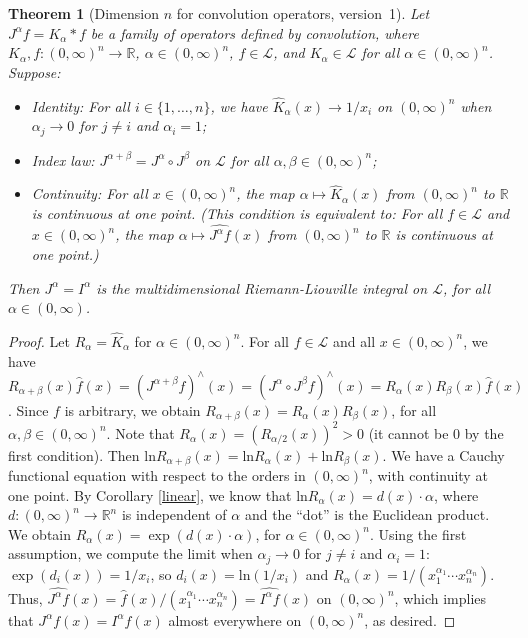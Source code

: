 \documentclass[12pt,reqno]{amsart}
\theoremstyle{plain}
\newtheorem{theorem}{Theorem}[section] %
\numberwithin{equation}{section} %
\begin{document}
\begin{theorem}[Dimension $n$ for convolution operators, version~1] \label{thn}
Let $J^\alpha f=K_\alpha\ast f$ be a family of operators defined by convolution, where $K_\alpha,f:(0,\infty)^n\rightarrow\mathbb{R}$, $\alpha\in (0,\infty)^n$, $f\in\mathcal{L}$, and $K_\alpha \in\mathcal{L}$ for all $\alpha\in (0,\infty)^n$. Suppose: 
\begin{itemize}
\item Identity: For all $i\in\{1,\ldots,n\}$, we have $\widehat{K}_{\alpha}(x)\rightarrow 1/x_i$ on $(0,\infty)^n$ when $\alpha_j\rightarrow 0$ for $j\neq i$ and $\alpha_i=1$; 
\item Index law: $J^{\alpha+\beta}=J^\alpha\circ J^\beta$  on $\mathcal{L}$ for all $\alpha,\beta\in (0,\infty)^n$; 
\item Continuity: For all $x\in (0,\infty)^n$, the map $\alpha\mapsto \widehat{K}_\alpha(x)$ from $(0,\infty)^n$ to $\mathbb{R}$ is continuous at one point. (This condition is equivalent to: For all $f\in\mathcal{L}$ and $x\in (0,\infty)^n$, the map $\alpha\mapsto \widehat{J^{\alpha}f}(x)$ from $(0,\infty)^n$ to $\mathbb{R}$ is continuous at one point.)
\end{itemize}
Then $J^\alpha=I^\alpha$ is the multidimensional Riemann-Liouville integral on $\mathcal{L}$, for all $\alpha\in (0,\infty)$. 
\end{theorem}
\begin{proof}
Let $R_\alpha=\widehat{K}_\alpha$ for $\alpha\in (0,\infty)^n$. For all $f\in\mathcal{L}$ and all $x\in (0,\infty)^n$, we have $R_{\alpha+\beta}(x)\widehat{f}(x)=(J^{\alpha+\beta}f)^\wedge(x)=(J^\alpha\circ J^\beta f)^\wedge(x)=R_\alpha(x)R_\beta(x)\widehat{f}(x)$. Since $f$ is arbitrary, we obtain $R_{\alpha+\beta}(x)=R_\alpha(x)R_\beta(x)$, for all $\alpha,\beta\in (0,\infty)^n$. Note that $R_\alpha(x)=(R_{\alpha/2}(x))^2>0$ (it cannot be $0$ by the first condition). Then $\mathrm{ln}R_{\alpha+\beta}(x)=\mathrm{ln}R_\alpha(x)+\mathrm{ln}R_\beta(x)$. We have a Cauchy functional equation with respect to the orders in $(0,\infty)^n$, with continuity at one point. By Corollary \ref{linear}, we know that $\mathrm{ln}R_\alpha(x)=d(x)\cdot\alpha$, where $d:(0,\infty)^n\rightarrow \mathbb{R}^n$ is independent of $\alpha$ and the ``dot'' is the Euclidean product. We obtain $R_\alpha(x)=\exp(d(x)\cdot \alpha)$, for $\alpha\in (0,\infty)^n$. Using the first assumption, we compute the limit when $\alpha_j\rightarrow 0$ for $j\neq i$ and $\alpha_i=1$: $\exp(d_i(x))=1/x_i$, so $d_i(x)=\mathrm{ln}(1/x_i)$ and $R_\alpha(x)=1/(x_1^{\alpha_1}\cdots x_n^{\alpha_n})$. Thus, $\widehat{J^\alpha f}(x)=\widehat{f}(x)/(x_1^{\alpha_1}\cdots x_n^{\alpha_n})=\widehat{I^\alpha f}(x)$ on $(0,\infty)^n$, which implies that $J^\alpha f(x)=I^\alpha f(x)$ almost everywhere on $(0,\infty)^n$, as desired.
\end{proof}
\end{document}
